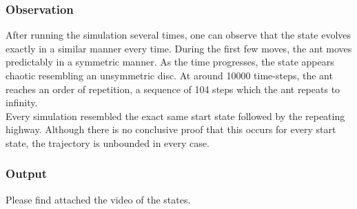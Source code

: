 \subsubsection{Observation}
After running the simulation several times, one can observe that the state evolves exactly in a similar manner every time. During the first few moves, the ant moves predictably in a symmetric manner. As the time progresses, the state appears chaotic resembling an unsymmetric disc. At around 10000 time-steps, the ant reaches an order of repetition, a sequence of 104 steps which the ant repeats to infinity. \\
Every simulation resembled the exact same start state followed by the repeating highway. Although there is no conclusive proof that this occurs for every start state, the trajectory is unbounded in every case.

\subsubsection{Output}
Please find attached the video of the states.

